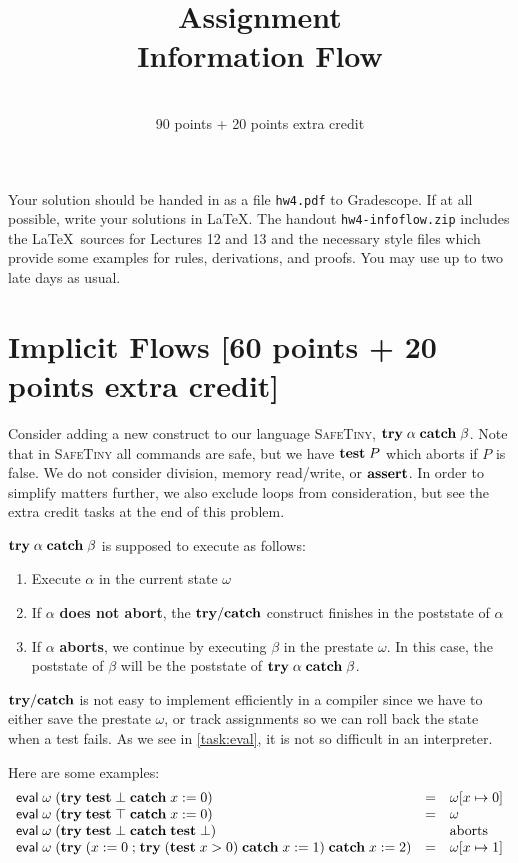 \documentclass[11pt]{article}
\title{Assignment \lecnum \\ Information Flow}
\date{\lecdate \\ 90 points + 20 points extra credit}
\begin{document}
\maketitle

Your solution should be handed in as a file \texttt{hw4.pdf} to Gradescope.  If
at all possible, write your solutions in \LaTeX.  The handout
\texttt{hw4-infoflow.zip} includes the \LaTeX\ sources for Lectures 12 and 13 and
the necessary style files which provide some examples for rules, derivations,
and proofs.  You may use up to two late days as usual.

\section{Implicit Flows [60 points + 20 points extra credit]}
\label{sec:implicit}

\newcommand{\trycatch}{\mb{try/catch}}
\newcommand{\try}[2]{\mb{try}\; #1\; \mb{catch}\; #2}

Consider adding a new construct to our language \textsc{SafeTiny},
$\mathbf{try}\; \alpha\; \mathbf{catch}\; \beta$.  Note that in \textsc{SafeTiny} all
commands are safe, but we have $\mathbf{test}\; P$ which aborts if $P$ is false.  We
do not consider division, memory read/write, or $\mathbf{assert}$.  In order to
simplify matters further, we also exclude loops from consideration, but see
the extra credit tasks at the end of this problem.

$\try{\alpha}{\beta}$ is supposed to execute as follows:
\begin{enumerate}
\item Execute $\alpha$ in the current state $\omega$
\item If $\alpha$ \textbf{does not abort}, the $\mathbf{try}/\mathbf{catch}$ construct
  finishes in the poststate of $\alpha$
\item If $\alpha$ \textbf{aborts}, we continue by executing $\beta$ in the
  prestate $\omega$.  In this case, the poststate of $\beta$ will be the
  poststate of $\try{\alpha}{\beta}$.
\end{enumerate}
$\trycatch$ is not easy to implement efficiently in a compiler since we have to
either save the prestate $\omega$, or track assignments so we can roll back the
state when a test fails.  As we see in \autoref{task:eval}, it is not so
difficult in an interpreter.

Here are some examples:
\[
  \begin{array}{lcl}
    \eval\; \omega\; (\try{\mb{test}\; \bot}{x := 0})
    & = & \omega[x \mapsto 0] \\
    \eval\; \omega\; (\try{\mb{test}\; \top}{x := 0})
    & = & \omega \\
    \eval\; \omega\; (\try{\mb{test}\; \bot}{\mb{test}\; \bot})
    & & \mbox{aborts} \\
    \eval\; \omega\; (\try{(x := 0 \semi \try{(\mb{test}\; x > 0)}{x := 1})}{x := 2})
    & = & \omega[x \mapsto 1]
  \end{array}
\]
\end{document}
